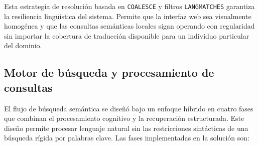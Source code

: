 Esta estrategia de resolución basada en \texttt{COALESCE} y filtros \texttt{LANGMATCHES} garantiza la resiliencia lingüística del sistema. Permite que la interfaz web sea visualmente homogénea y que las consultas semánticas locales sigan operando con regularidad sin importar la cobertura de traducción disponible para un individuo particular del dominio.

\subsection{Motor de búsqueda y procesamiento de consultas}

El flujo de búsqueda semántica se diseñó bajo un enfoque híbrido en cuatro fases que combinan el procesamiento cognitivo y la recuperación estructurada. Este diseño permite procesar lenguaje natural sin las restricciones sintácticas de una búsqueda rígida por palabras clave. Las fases implementadas en la solución son:

